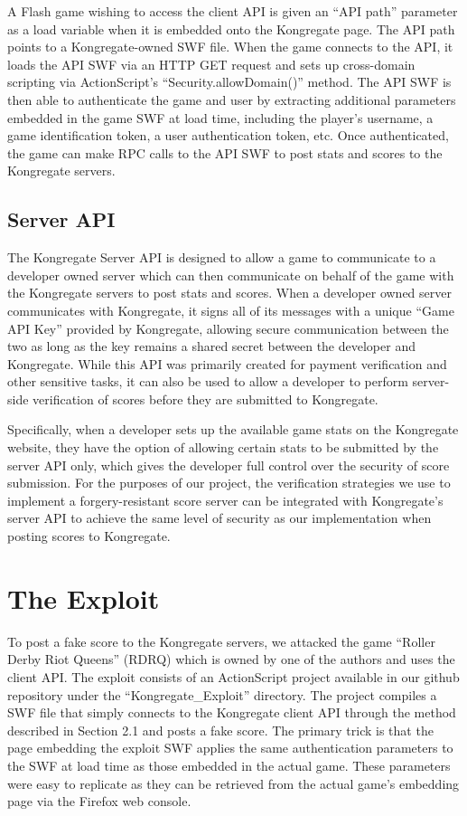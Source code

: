 \documentclass [11pt,twocolumn] {article}
\begin{document}
A Flash game wishing to access the client API is given an ``API path'' parameter as a load variable when it is embedded onto the Kongregate page. The API path points to a Kongregate-owned SWF file. When the game connects to the API, it loads the API SWF via an HTTP GET request and sets up cross-domain scripting via ActionScript's ``Security.allowDomain()'' method. The API SWF is then able to authenticate the game and user by extracting additional parameters embedded in the game SWF at load time, including the player's username, a game identification token, a user authentication token, etc. Once authenticated, the game can make RPC calls to the API SWF to post stats and scores to the Kongregate servers. 

\subsection {Server API} 

The Kongregate Server API is designed to allow a game to communicate to a developer owned server which can then communicate on behalf of the game with the Kongregate servers to post stats and scores. When a developer owned server communicates with Kongregate, it signs all of its messages with a unique ``Game API Key'' provided by Kongregate, allowing secure communication between the two as long as the key remains a shared secret between the developer and Kongregate. While this API was primarily created for payment verification and other sensitive tasks, it can also be used to allow a developer to perform server-side verification of scores before they are submitted to Kongregate. 

Specifically, when a developer sets up the available game stats on the Kongregate website, they have the option of allowing certain stats to be submitted by the server API only, which gives the developer full control over the security of score submission. For the purposes of our project, the verification strategies we use to implement a forgery-resistant score server can be integrated with Kongregate's server API to achieve the same level of security as our implementation when posting scores to Kongregate. 

\section { The Exploit }

To post a fake score to the Kongregate servers, we attacked the game ``Roller Derby Riot Queens'' (RDRQ) which is owned by one of the authors and uses the client API. The exploit consists of an ActionScript project available in our github repository under the ``Kongregate\_Exploit'' directory. The project compiles a SWF file that simply connects to the Kongregate client API through the method described in Section 2.1 and posts a fake score. The primary trick is that the page embedding the exploit SWF applies the same authentication parameters to the SWF at load time as those embedded in the actual game. These parameters were easy to replicate as they can be retrieved from the actual game's embedding page via the Firefox web console. 
\end{document}

